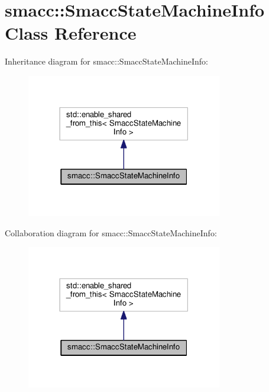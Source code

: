 \hypertarget{classsmacc_1_1SmaccStateMachineInfo}{\section{smacc\-:\-:Smacc\-State\-Machine\-Info Class Reference}
\label{classsmacc_1_1SmaccStateMachineInfo}
}


Inheritance diagram for smacc\-:\-:Smacc\-State\-Machine\-Info\-:
\nopagebreak
\begin{figure}[H]
\begin{center}
\leavevmode
\includegraphics[width=242pt]{classsmacc_1_1SmaccStateMachineInfo__inherit__graph}
\end{center}
\end{figure}


Collaboration diagram for smacc\-:\-:Smacc\-State\-Machine\-Info\-:
\nopagebreak
\begin{figure}[H]
\begin{center}
\leavevmode
\includegraphics[width=242pt]{classsmacc_1_1SmaccStateMachineInfo__coll__graph}
\end{center}
\end{figure}
